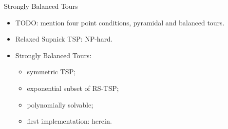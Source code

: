 \documentclass[
  size=10pt,
  style=klope,
  paper=screen,
  pauseslide,
  nopagebreaks,
  hlsections,
  fleqn
]{powerdot}
\def\todo{\color{red}}
\begin{document}
\begin{slide}{Strongly Balanced Tours}
  \begin{itemize}
  \item
  {\todo TODO:} mention four point conditions, pyramidal and balanced tours.
  \item
  Relaxed Supnick TSP: NP-hard.
  \item
  Strongly Balanced Tours:
    \begin{itemize}
    \item symmetric TSP;
    \item exponential subset of RS-TSP;
    \item polynomially solvable;
    \item first implementation: herein.
    \end{itemize}
  \end{itemize}
\end{slide}
\end{document}
